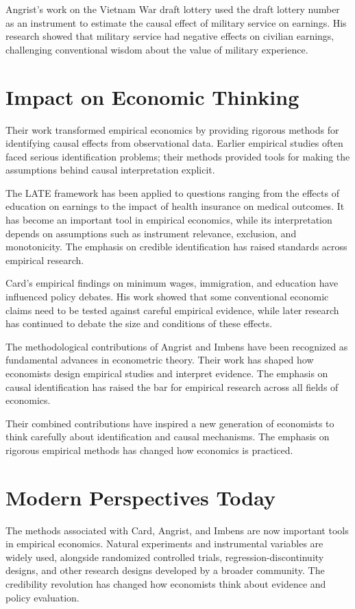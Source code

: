 Angrist's work on the Vietnam War draft lottery used the draft lottery
number as an instrument to estimate the causal effect of military service
on earnings. His research showed that military service had negative
effects on civilian earnings, challenging conventional wisdom about the
value of military experience.

\section{Impact on Economic Thinking}
Their work transformed empirical economics by providing rigorous methods for
identifying causal effects from observational data. Earlier empirical studies
often faced serious identification problems; their methods provided tools for
making the assumptions behind causal interpretation explicit.

The LATE framework has been applied to questions ranging from the effects of
education on earnings to the impact of health insurance on medical outcomes. It
has become an important tool in empirical economics, while its interpretation
depends on assumptions such as instrument relevance, exclusion, and monotonicity.
The emphasis on credible identification has raised standards across empirical
research.

Card's empirical findings on minimum wages, immigration, and education have
influenced policy debates. His work showed that some conventional economic
claims need to be tested against careful empirical evidence, while later
research has continued to debate the size and conditions of these effects.

The methodological contributions of Angrist and Imbens have been recognized
as fundamental advances in econometric theory. Their work has shaped how
economists design empirical studies and interpret evidence. The emphasis
on causal identification has raised the bar for empirical research across
all fields of economics.

Their combined contributions have inspired a new generation of economists to
think carefully about identification and causal mechanisms. The emphasis on
rigorous empirical methods has changed how economics is practiced.

\section{Modern Perspectives Today}
The methods associated with Card, Angrist, and Imbens are now important tools
in empirical economics. Natural experiments and instrumental variables are
widely used, alongside randomized controlled trials, regression-discontinuity
designs, and other research designs developed by a broader community. The
credibility revolution has changed how economists think about evidence and
policy evaluation.

